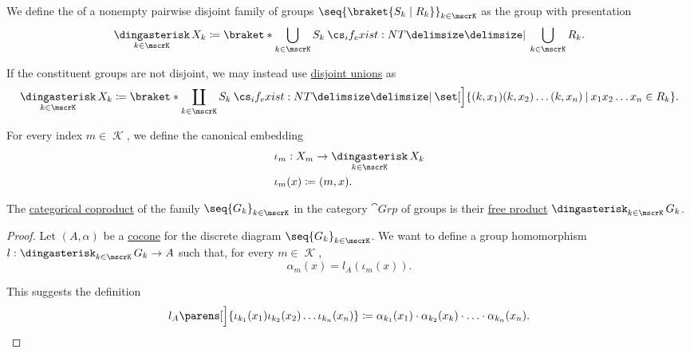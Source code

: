 \begin{definition}\label{def:group_free_product}
  We define the  of a nonempty pairwise disjoint family of groups \( \seq{ \braket{S_k \mid R_k} }_{k \in \mscrK} \) as the group with presentation
  \begin{equation*}
    \Ast_{k \in \mscrK} X_k \coloneqq \braket*{ \bigcup_{k \in \mscrK} S_k \given* \bigcup_{k \in \mscrK} R_k }.
  \end{equation*}

  If the constituent groups are not disjoint, we may instead use \hyperref[def:disjoint_union]{disjoint unions} as
  \small
  \begin{equation*}
    \Ast_{k \in \mscrK} X_k \coloneqq \braket*{ \coprod_{k \in \mscrK} S_k \given* \set[\Big]{ (k, x_1) (k, x_2) \ldots (k, x_n) \given x_1 x_2 \ldots x_n \in R_k } }.
  \end{equation*}
  \normalsize

  For every index \( m \in \mscrK \), we define the canonical embedding
  \begin{equation*}
    \begin{aligned}
       &\iota_m: X_m \to \Ast_{k \in \mscrK} X_k \\
       &\iota_m(x) \coloneqq (m, x).
    \end{aligned}
  \end{equation*}
\end{definition}

\begin{proposition}\label{thm:group_coproduct}
  The \hyperref[def:discrete_category_limits]{categorical coproduct} of the family \( \seq{ G_k }_{k \in \mscrK} \) in the category \hyperref[def:group/category]{\( \cat{Grp} \)} of groups is their \hyperref[def:group_free_product]{free product} \( \Ast_{k \in \mscrK} G_k \).
\end{proposition}
\begin{proof}
  Let \( (A, \alpha) \) be a \hyperref[def:category_of_cones/cocone]{cocone} for the discrete diagram \( \seq{ G_k }_{k \in \mscrK} \). We want to define a group homomorphism \( l: \Ast_{k \in \mscrK} G_k \to A \) such that, for every \( m \in \mscrK \),
  \begin{equation*}
    \alpha_m(x) = l_A(\iota_m(x)).
  \end{equation*}

  This suggests the definition
  \begin{equation*}
    l_A\parens[\Big]{ \iota_{k_1}(x_1) \iota_{k_2}(x_2) \ldots \iota_{k_n}(x_n) } \coloneqq \alpha_{k_1}(x_1) \cdot \alpha_{k_2}(x_k) \cdot \ldots \cdot \alpha_{k_n}(x_n).
  \end{equation*}
\end{proof}

